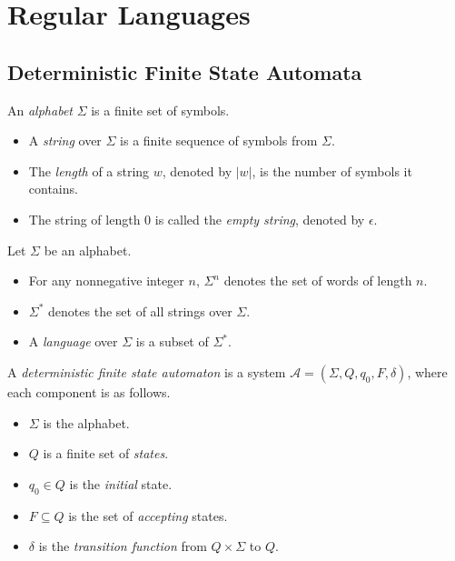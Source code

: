 \chapter{Regular Languages}
\section{Deterministic Finite State Automata}
\begin{definition}\label{def:string}
  An \emph{alphabet} $\Sigma$ is a finite set of symbols.
  \begin{itemize}
    \item A \emph{string} over $\Sigma$ is a finite sequence of symbols from
      $\Sigma$.
    \item The \emph{length} of a string $w$, denoted by $|w|$, is the number of
      symbols it contains.
    \item The string of length $0$ is called the \emph{empty string}, denoted
      by $\epsilon$.
  \end{itemize}
\end{definition}

\begin{definition}\label{def:language}
  Let $\Sigma$ be an alphabet.
  \begin{itemize}
    \item For any nonnegative integer $n$, $\Sigma^n$ denotes the set of words
      of length $n$.
    \item $\Sigma^*$ denotes the set of all strings over $\Sigma$.
    \item A \emph{language} over $\Sigma$ is a subset of $\Sigma^*$.
  \end{itemize}
\end{definition}

\begin{definition}\label{def:dfa}
  A \emph{deterministic finite state automaton} is a system
  $\mathcal{A} = (\Sigma, Q, q_0, F, \delta)$, where each component is as
  follows.
  \begin{itemize}
    \item $\Sigma$ is the alphabet.
    \item $Q$ is a finite set of \emph{states}.
    \item $q_0 \in Q$ is the \emph{initial} state.
    \item $F \subseteq Q$ is the set of \emph{accepting} states.
    \item $\delta$ is the \emph{transition function} from $Q \times \Sigma$ to
      $Q$.
  \end{itemize}
\end{definition}

